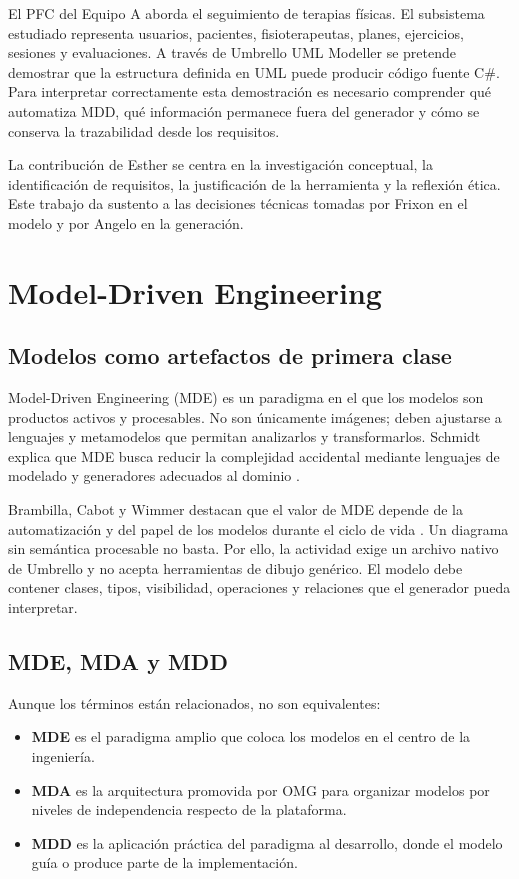 El PFC del Equipo A aborda el seguimiento de terapias físicas. El subsistema estudiado representa usuarios, pacientes, fisioterapeutas, planes, ejercicios, sesiones y evaluaciones. A través de Umbrello UML Modeller se pretende demostrar que la estructura definida en UML puede producir código fuente C\#. Para interpretar correctamente esta demostración es necesario comprender qué automatiza MDD, qué información permanece fuera del generador y cómo se conserva la trazabilidad desde los requisitos.

La contribución de Esther se centra en la investigación conceptual, la identificación de requisitos, la justificación de la herramienta y la reflexión ética. Este trabajo da sustento a las decisiones técnicas tomadas por Frixon en el modelo y por Angelo en la generación.

\section{Model-Driven Engineering}
\subsection{Modelos como artefactos de primera clase}
Model-Driven Engineering (MDE) es un paradigma en el que los modelos son productos activos y procesables. No son únicamente imágenes; deben ajustarse a lenguajes y metamodelos que permitan analizarlos y transformarlos. Schmidt explica que MDE busca reducir la complejidad accidental mediante lenguajes de modelado y generadores adecuados al dominio \cite{Schmidt2006}.

Brambilla, Cabot y Wimmer destacan que el valor de MDE depende de la automatización y del papel de los modelos durante el ciclo de vida \cite{Brambilla2017}. Un diagrama sin semántica procesable no basta. Por ello, la actividad exige un archivo nativo de Umbrello y no acepta herramientas de dibujo genérico. El modelo debe contener clases, tipos, visibilidad, operaciones y relaciones que el generador pueda interpretar.

\subsection{MDE, MDA y MDD}
Aunque los términos están relacionados, no son equivalentes:
\begin{itemize}
  \item \textbf{MDE} es el paradigma amplio que coloca los modelos en el centro de la ingeniería.
  \item \textbf{MDA} es la arquitectura promovida por OMG para organizar modelos por niveles de independencia respecto de la plataforma.
  \item \textbf{MDD} es la aplicación práctica del paradigma al desarrollo, donde el modelo guía o produce parte de la implementación.
\end{itemize}

